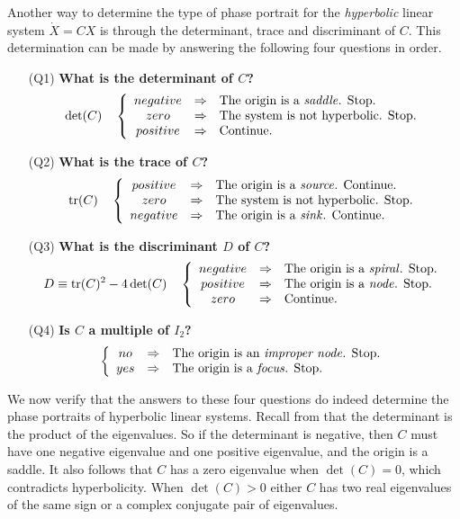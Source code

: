 \documentclass{ximera}
\begin{document}
Another way to determine the type of phase portrait for the
{\em hyperbolic\/} linear system $\dot{X}=CX$ is through the
determinant, trace and
discriminant of $C$. This determination can be made by
answering the following four questions in order.
\begin{itemize}
\item[(Q1)]  {\bf What is the determinant of $C$?}
\[
\det(C) \quad \left\{\begin{array}{ccl}
negative & \Rightarrow & \mbox{The origin is a {\em saddle\/}. Stop.}  \\
zero 	& \Rightarrow & \mbox{The system is not hyperbolic. Stop.}  \\
positive & \Rightarrow & \mbox{Continue.}  \end{array}\right.
\]
\item[(Q2)]  {\bf What is the trace of $C$?}
\[
{\rm tr}(C) \quad \left\{\begin{array}{ccl}
positive & \Rightarrow & \mbox{The origin is a {\em source\/}. Continue.}  \\
zero 	& \Rightarrow & \mbox{The system is not hyperbolic. Stop.}  \\
negative & \Rightarrow & \mbox{The origin is a {\em sink\/}. Continue.}
\end{array}\right.
\]
\item[(Q3)]  {\bf What is the discriminant $D$ of $C$?}
\[
D\equiv {\rm tr}(C)^2-4\det(C) \quad \left\{\begin{array}{ccl}
negative & \Rightarrow & \mbox{The origin is a {\em spiral\/}. Stop.}  \\
positive & \Rightarrow & \mbox{The origin is a {\em node\/}. Stop.} \\
zero 	& \Rightarrow & \mbox{Continue.}
\end{array}\right.
\]
\item[(Q4)]  {\bf Is $C$ a multiple of $I_2$?}
\[
\left\{\begin{array}{ccl}
no & \Rightarrow & \mbox{The origin is an {\em improper node\/}. Stop.}  \\
yes & \Rightarrow & \mbox{The origin is a {\em focus\/}. Stop.}
\end{array}\right.
\]
\end{itemize}

We now verify that the answers to these four questions do indeed
determine the phase portraits of hyperbolic linear systems.  Recall
from  that the determinant is the product of the
eigenvalues.  So if the determinant is negative, then $C$ must have
one negative eigenvalue and one positive eigenvalue, and the origin
is a saddle.  It also follows that $C$ has a zero eigenvalue when
$\det(C)=0$, which contradicts hyperbolicity.  When $\det(C)>0$
either $C$ has two real eigenvalues of the same sign or a complex
conjugate pair of eigenvalues.
\end{document}
